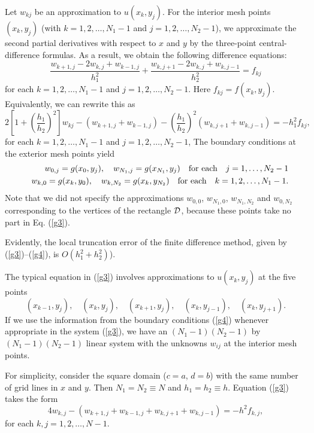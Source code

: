 Let $w_{kj}$ be an approximation to $u(x_{k}, y_{j})$.
For the interior mesh points $(x_{k}, y_{j})$ (with
$k=1,2,\dots,N_{1}-1$ and $j=1,2,\dots,N_{2}-1$), we approximate
the second partial derivatives with respect to $x$ and $y$
by the three-point central-difference formulas. As a result, we obtain the following
difference equations:
\[
\frac{w_{k+1,j}-2w_{k,j}+w_{k-1,j}}{h_{1}^{2}}+
\frac{w_{k,j+1}-2w_{k,j}+w_{k,j-1}}{h_{2}^{2}}=f_{kj}
\]
for each $k=1,2,\dots,N_{1}-1$ and $j=1,2,\dots,N_{2}-1$.
Here $f_{kj}=f(x_{k}, y_{j})$. Equivalently, we can rewrite
this as
\begin{equation}
2\left[1+\left(\frac{h_{1}}{h_{2}}\right)^{2}\right]w_{kj}-\left(w_{k+1,j}+w_{k-1,j}\right)
-\left(\frac{h_{1}}{h_{2}}\right)^{2}\left(w_{k,j+1}+w_{k,j-1}\right)
=-h_{1}^{2}f_{kj}, \label{g3}
\end{equation}
for each $k=1,2,\dots,N_{1}-1$ and $j=1,2,\dots,N_{2}-1$,
The boundary conditions at the
exterior mesh points yield
\begin{eqnarray}
&&w_{0,j}=g(x_{0}, y_{j}), \quad w_{N_{1},j}=g(x_{N_{1}}, y_{j})
\quad \hbox{for each} \quad j=1,\dots,N_{2}-1 \label{g4} \\
&&w_{k,0}=g(x_{k}, y_{0}), \quad w_{k,N_{2}}=g(x_{k}, y_{N_{2}})
\quad \hbox{for each} \quad k=1,2,\dots,N_{1}-1.\nonumber  
\end{eqnarray}
Note that we did not specify the approximations $w_{0,0}$,
$w_{N_{1},0}$, $w_{N_{1},N_{2}}$ and $w_{0,N_{2}}$ corresponding to
the vertices of the rectangle ${\cal D}$, because these points take
no part in Eq. (\ref{g3}).

\vskip 0.3cm
 
Evidently, the local truncation
error of the finite difference method, given by (\ref{g3})--(\ref{g4}), is $O(h_{1}^{2}+h_{2}^{2})$).

\vskip 0.3cm
 
The typical equation in (\ref{g3}) involves approximations to $u(x_{k}, y_{j})$ at the five
points
\[
(x_{k-1}, y_{j}), \quad (x_{k}, y_{j}), \quad (x_{k+1}, y_{j}), \quad
(x_{k}, y_{j-1}), \quad (x_{k}, y_{j+1}).
\]
If we use the information from the boundary conditions (\ref{g4})
whenever appropriate in the system (\ref{g3}), we have an
$(N_{1}-1)(N_{2}-1)$ by $(N_{1}-1)(N_{2}-1)$ linear system with
the unknowns $w_{ij}$ at the interior mesh points.

\vskip 0.3cm
 
For simplicity, consider the square domain ($c=a$, $d=b$) with the same number of grid lines
in $x$ and $y$. Then $N_{1}=N_{2}\equiv N$ and $h_{1}=h_{2}\equiv h$. Equation (\ref{g3})
takes the form
\begin{equation}
4w_{k,j}-\left(w_{k+1,j}+w_{k-1,j}+w_{k,j+1}+w_{k,j-1}\right)
=-h^{2}f_{k,j}, \label{g5}
\end{equation}
for each $k,j=1,2,\dots,N-1$.


